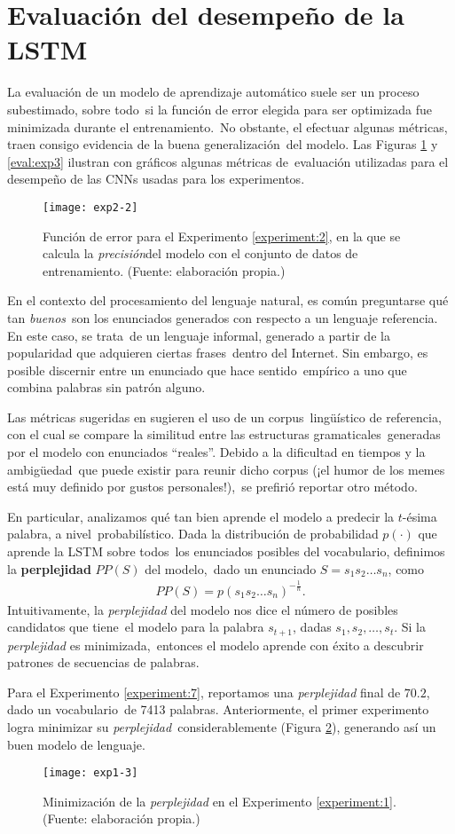 \section{Evaluación del desempeño de la LSTM} \label{sec:metrics}

\noindent
La evaluación de un modelo de aprendizaje automático suele ser un proceso subestimado, sobre todo\
si la función de error elegida para ser optimizada fue minimizada durante el entrenamiento.\
No obstante, el efectuar algunas métricas, traen consigo evidencia de la buena generalización\
del modelo. Las Figuras \ref{eval:exp2} y \ref{eval:exp3} ilustran con gráficos algunas métricas de\
evaluación utilizadas para el desempeño de las CNNs usadas para los experimentos.

\begin{figure}[H]
  \texttt{[image: exp2-2]}
  \caption[Nota al pie]{
    Función de error para el Experimento \ref{experiment:2}, en la que se
    calcula la \emph{precisión}\footnotemark del modelo con el conjunto de
    datos de entrenamiento.
    (Fuente: elaboración propia.)
  }
  \label{eval:exp2}
\end{figure}

En el contexto del procesamiento del lenguaje natural, es común preguntarse qué tan \emph{buenos}\
son los enunciados generados con respecto a un lenguaje referencia. En este caso, se trata\
de un lenguaje informal, generado a partir de la popularidad que adquieren ciertas frases\
dentro del Internet. Sin embargo, es posible discernir entre un enunciado que hace sentido\
empírico a uno que combina palabras sin patrón alguno.\par
Las métricas sugeridas en \cite{DBLP:journals/corr/VinyalsTBE16} sugieren el uso de un corpus\
lingüístico de referencia, con el cual se compare la similitud entre las estructuras gramaticales\
generadas por el modelo con enunciados ``reales''. Debido a la dificultad en tiempos y la ambigüedad\
que puede existir para reunir dicho corpus (¡el humor de los memes está muy definido por gustos personales!),\
se prefirió reportar otro método.\par
En particular, analizamos qué tan bien aprende el modelo a predecir la $t$-ésima palabra, a nivel\
probabilístico. Dada la distribución de probabilidad $p(\cdot)$ que aprende la LSTM sobre todos\
los enunciados posibles del vocabulario, definimos la \textbf{perplejidad} $PP(S)$ del modelo,\
dado un enunciado $S = s_1 s_2 \ldots s_n$, como
\begin{align}
  PP(S) = p(s_1 s_2 \ldots s_n) ^{-\frac{1}{n}}.
\end{align}
Intuitivamente, la \emph{perplejidad} del modelo nos dice el número de posibles candidatos que tiene\
el modelo para la palabra $s_{t+1}$, dadas $s_1, s_2, \ldots, s_t$. Si la \emph{perplejidad} es minimizada,\
entonces el modelo aprende con éxito a descubrir patrones de secuencias de palabras.\par
Para el Experimento \ref{experiment:7}, reportamos una \emph{perplejidad} final de $70.2$, dado un vocabulario\
de 7413 palabras. Anteriormente, el primer experimento logra minimizar su \emph{perplejidad}\
considerablemente (Figura \ref{eval:exp1}), generando así un buen modelo de lenguaje.

\begin{figure}[h]
  \texttt{[image: exp1-3]}
  \caption{
    Minimización de la \emph{perplejidad} en el Experimento \ref{experiment:1}.
    (Fuente: elaboración propia.)
  }
  \label{eval:exp1}
\end{figure}
